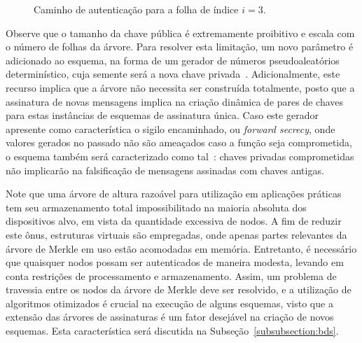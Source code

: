 \documentclass{ufsctex/ufsctex}
\newcommand{\pk}{\mathcal{P}_{k}}
\begin{document}
\begin{figure}
  \centering
  \caption{Caminho de autenticação
    para a folha de índice $i = 3$.}\label{fig:auth}
\end{figure}

Observe que o tamanho da chave pública é extremamente proibitivo e escala com o
número de folhas da árvore. Para resolver esta limitação, um novo parâmetro é
adicionado ao esquema, na forma de um gerador de números pseudoaleatórios
determinístico, cuja semente será a nova chave privada~\cite[Subseção
6.4.2.3]{Goldreich:book:2004}. Adicionalmente, este recurso implica que a
árvore não necessita ser construída totalmente, posto que a assinatura de novas
mensagens implica na criação dinâmica de pares de chaves para estas instâncias
de esquemas de assinatura única. Caso este gerador apresente como
característica o sigilo encaminhado, ou \emph{forward secrecy}, onde valores
gerados no passado não são ameaçados caso a função seja comprometida, o esquema
também será caracterizado como tal~\cite[pp.  45]{Bernstein:book:2008}: chaves
privadas comprometidas não implicarão na falsificação de mensagens assinadas
com chaves antigas.

Note que uma árvore de altura razoável para utilização em aplicações práticas
tem seu armazenamento total impossibilitado na maioria absoluta dos
dispositivos alvo, em vista da quantidade excessiva de nodos. A fim de reduzir
este ônus, estruturas virtuais são empregadas, onde apenas partes relevantes da
árvore de Merkle em uso estão acomodadas em memória. Entretanto, é necessário
que quaisquer nodos possam ser autenticados de maneira modesta, levando em
conta restrições de processamento e armazenamento. Assim, um problema de
travessia entre os nodos da árvore de Merkle deve ser resolvido, e a utilização
de algoritmos otimizados é crucial na execução de alguns esquemas, visto que a
extensão das árvores de assinaturas é um fator desejável na criação de novos
esquemas. Esta característica será discutida na
Subseção~\ref{subsubsection:bds}.
\end{document}
